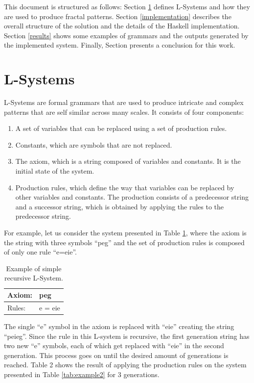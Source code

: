 \documentclass{article}
\begin{document}
This document is structured as follows: Section \ref{lsystems} defines L-Systems and
how they are used to produce fractal patterns. Section \ref{implementation} describes
the overall structure of the solution and the details of the Haskell implementation.
Section \ref{results} shows some examples of grammars and the outputs
generated by the implemented system. Finally, Section \label{conclusion} presents
a conclusion for this work.

\section{L-Systems}
\label{lsystems}

L-Systems are formal grammars that are used to produce intricate and complex patterns
that are self similar across many scales. It consists of four components:

\begin{enumerate}
\item A set of variables that can be replaced using a set of production rules.
\item Constants, which are symbols that are not replaced.
\item The axiom, which is a string composed of variables and constants. It is the initial state of the system.
\item Production rules, which define the way that variables can be replaced by other variables and constants.
The production consists of a predecessor string and a successor string, which is obtained by applying the rules
 to the predecessor string.
\end{enumerate}

For example, let us consider the system presented
in Table \ref{tab:example1}, where the axiom is the string with three symbols ``peg'' and the set of production
rules is composed of only one rule ``e=eie''.

\begin{table}[!h]
\centering
\begin{tabular}{|l|l|}
\hline
Axiom: & peg     \\ \hline
Rules: & e = eie \\ \hline
\end{tabular}
\caption{Example of simple recursive L-System.}
\label{tab:example1}
\end{table}

The single ``e'' symbol in the axiom is replaced with ``eie'' creating the string ``peieg''.
Since the rule in this L-system is recursive, the first generation string has two new ``e''
symbols, each of which get replaced with  ``eie'' in the second generation. This process goes
on until the desired amount of generations is reached. Table 2 shows the result of applying
the production rules on the system presented in Table \ref{tab:example2} for 3 generations.
\end{document}
